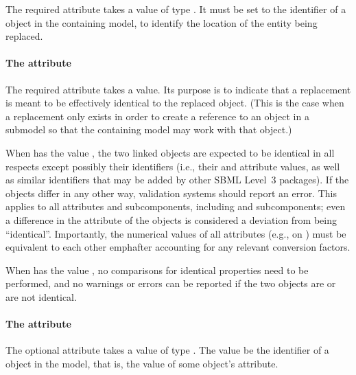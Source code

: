 The required attribute  takes a value of type
.  It must be set to the identifier of a \Submodel
object in the containing model, to identify the location of the entity
being replaced.


\paragraph{The \hspace*{1pt} attribute}
\label{replacedelement-identical}

The required attribute  takes a 
value.  Its purpose is to indicate that a replacement is meant to be
effectively identical to the replaced object.  (This is the case when a
replacement only exists in order to create a reference to an object in a
submodel so that the containing model may work with that object.)

When  has the value , the two linked objects
are expected to be identical in all respects except possibly their
identifiers (i.e., their  and  attribute values,
as well as similar identifiers that may be added by other SBML Level~3
packages).  If the objects differ in any other way, validation systems
should report an error.  This applies to all attributes and
subcomponents, including \Annotation and \Notes subcomponents; even a
difference in the  attribute of the objects is considered a
deviation from being ``identical''.  Importantly, the numerical values
of all attributes (e.g.,  on \Species) must be
equivalent to each other emph{after accounting for any relevant
  conversion factors}.

When  has the value , no comparisons for
identical properties need to be performed, and no warnings or errors can
be reported if the two objects are or are not identical.


\paragraph{The \hspace*{1pt} attribute}
\label{replacedelement-deletion}

The optional attribute  takes a value of type
.  The value be the identifier of a \Deletion object in
the model, that is, the value of some \Deletion object's 
attribute.  

